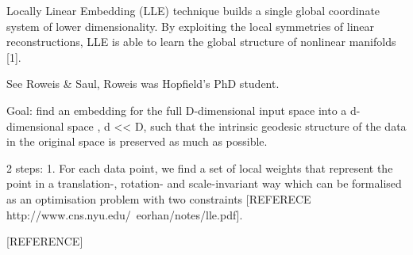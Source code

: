 \documentclass[journal, a4paper]{IEEEtran}
\begin{document}
 Locally Linear Embedding (LLE) technique builds a single global coordinate system of lower dimensionality. By exploiting the local symmetries of linear reconstructions, LLE is able to learn the global structure of nonlinear manifolds [1].

See Roweis \& Saul, Roweis was Hopfield's PhD student.

Goal: find an embedding for the full D-dimensional input space into a d-dimensional space , d << D, such that the intrinsic geodesic structure of the data in the original space is preserved as much as possible.

2 steps: 1. For each data point, we find a set of local weights that represent the point in a translation-, rotation- and scale-invariant way which can be formalised as an optimisation problem with two constraints [REFERECE http://www.cns.nyu.edu/~eorhan/notes/lle.pdf].

[REFERENCE]
\end{document}
